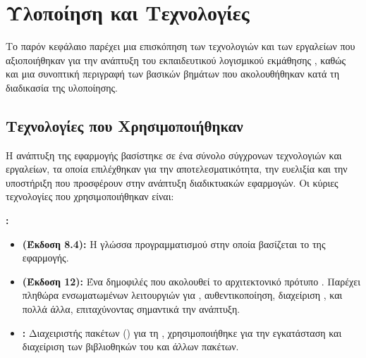 
\section{Υλοποίηση και Τεχνολογίες}
\label{sec:ylopoiisi_texnologies}
Το παρόν κεφάλαιο παρέχει μια επισκόπηση των τεχνολογιών και των εργαλείων που αξιοποιήθηκαν για την ανάπτυξη του εκπαιδευτικού λογισμικού εκμάθησης , καθώς και μια συνοπτική περιγραφή των βασικών βημάτων που ακολουθήθηκαν κατά τη διαδικασία της υλοποίησης.

\subsection{Τεχνολογίες που Χρησιμοποιήθηκαν}
\label{sec:texnologies_used}
Η ανάπτυξη της εφαρμογής βασίστηκε σε ένα σύνολο σύγχρονων τεχνολογιών και εργαλείων, τα οποία επιλέχθηκαν για την αποτελεσματικότητα, την ευελιξία και την υποστήριξη που προσφέρουν στην ανάπτυξη διαδικτυακών εφαρμογών. Οι κύριες τεχνολογίες που χρησιμοποιήθηκαν είναι:

\textbf{:}
\begin{itemize}[leftmargin=*, noitemsep]
    \item \textbf{ (Έκδοση 8.4):} Η γλώσσα προγραμματισμού στην οποία βασίζεται το  της εφαρμογής.
    \item \textbf{ (Έκδοση 12):} Ένα δημοφιλές  που ακολουθεί το αρχιτεκτονικό πρότυπο . Παρέχει πληθώρα ενσωματωμένων λειτουργιών για , αυθεντικοποίηση, διαχείριση , και πολλά άλλα, επιταχύνοντας σημαντικά την ανάπτυξη.
    \item \textbf{:} Διαχειριστής πακέτων () για τη , χρησιμοποιήθηκε για την εγκατάσταση και διαχείριση των βιβλιοθηκών του  και άλλων  πακέτων.
\end{itemize}

